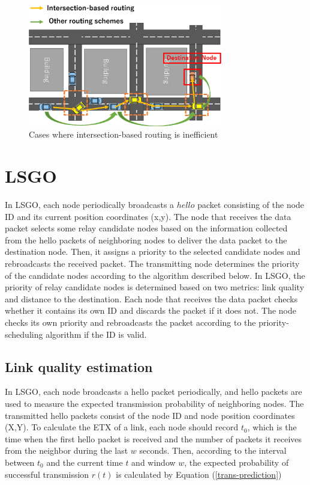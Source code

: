 \documentclass[conference]{IEEEtran}
\begin{document}
\begin{figure}[!ht]
\centering
\includegraphics[width=85mm]{figures/intersection_routing.eps}
\caption{Cases where intersection-based routing is inefficient}
\label{fig:intersection_routing}
\end{figure}



\section{LSGO}
\label{LSGO}

In LSGO, each node periodically broadcasts a $hello$ packet consisting of the node ID and its current position coordinates (x,y). 
The node that receives the data packet  selects some relay candidate nodes based on the  information collected from the hello packets  of neighboring nodes to deliver the data packet to the destination node. 
Then, it assigns a priority to the selected candidate nodes and rebroadcasts the received packet. 
The transmitting node  determines the priority of the candidate nodes according to  the algorithm described below. 
In LSGO, the priority of relay candidate nodes is determined based on two metrics: link quality and distance to the destination. 
Each node that receives the data packet checks whether it contains its own ID and discards the packet if it does not.
The node checks its own priority and rebroadcasts the packet according to the priority-scheduling algorithm if the ID  is valid.


\subsection{Link quality estimation}

  In LSGO, each node broadcasts a hello packet periodically, and hello packets are used to measure the expected transmission probability of neighboring nodes. The transmitted hello packets consist of the node ID and node position coordinates (X,Y). To calculate the ETX of a link, each node should record $t_{0}$, which is the time when the first hello packet is received and the number of packets it receives from the neighbor during the last $w$ seconds. Then, according to the interval between $t_{0}$ and the current time $t$ and window $w$, the expected probability of successful transmission $r(t)$ is calculated by Equation (\ref{trans-prediction})
\end{document}
